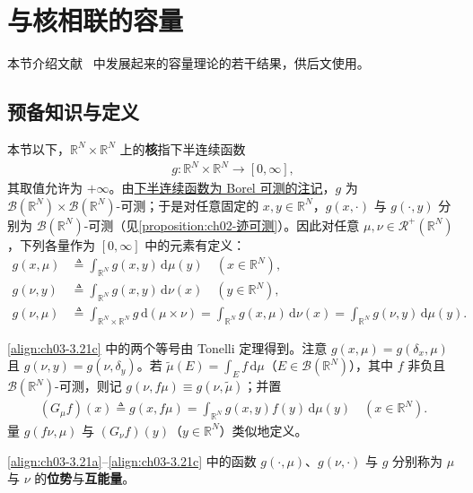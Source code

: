 \documentclass[../../main.tex]{subfiles}%
\begin{document}
\section{与核相联的容量}\label{section:ch03-核容量}

本节介绍文献~\cite{ref72} 中发展起来的容量理论的若干结果，供后文使用。

\subsection{预备知识与定义}\label{subsection:ch03-核预备}

本节以下，$\mathbb{R}^N\times\mathbb{R}^N$ 上的\textbf{核}指下半连续函数
\begin{align*}
g:\mathbb{R}^N\times\mathbb{R}^N\to[0,\infty],
\end{align*}
其取值允许为 $+\infty$。由\hyperref[remark:ch02-连续半连续Borel]{下半连续函数为 Borel 可测的注记}，$g$ 为 $\mathcal{B}(\mathbb{R}^N)\times\mathcal{B}(\mathbb{R}^N)$-可测；于是对任意固定的 $x,y\in\mathbb{R}^N$，$g(x,\cdot)$ 与 $g(\cdot,y)$ 分别为 $\mathcal{B}(\mathbb{R}^N)$-可测（见\cref{proposition:ch02-迹可测}）。因此对任意 $\mu,\nu\in\mathscr{R}^+(\mathbb{R}^N)$，下列各量作为 $[0,\infty]$ 中的元素有定义：
\begin{align}
g(x,\mu)&\triangleq\int_{\mathbb{R}^N}g(x,y)\,\mathrm{d}\mu(y)\quad(x\in\mathbb{R}^N),\label{align:ch03-3.21a}\\
g(\nu,y)&\triangleq\int_{\mathbb{R}^N}g(x,y)\,\mathrm{d}\nu(x)\quad(y\in\mathbb{R}^N),\label{align:ch03-3.21b}\\
g(\nu,\mu)&\triangleq\int_{\mathbb{R}^N\times\mathbb{R}^N}g\,\mathrm{d}(\mu\times\nu)
=\int_{\mathbb{R}^N}g(x,\mu)\,\mathrm{d}\nu(x)
=\int_{\mathbb{R}^N}g(\nu,y)\,\mathrm{d}\mu(y).\label{align:ch03-3.21c}
\end{align}

\eqref{align:ch03-3.21c} 中的两个等号由 Tonelli 定理得到。注意 $g(x,\mu)=g(\delta_x,\mu)$ 且 $g(\nu,y)=g(\nu,\delta_y)$。若 $\tilde\mu(E)=\int_Ef\,\mathrm{d}\mu$（$E\in\mathcal{B}(\mathbb{R}^N)$），其中 $f$ 非负且 $\mathcal{B}(\mathbb{R}^N)$-可测，则记 $g(\nu,f\mu)\equiv g(\nu,\tilde\mu)$；并置
\begin{align}
(G_\mu f)(x)\triangleq g(x,f\mu)=\int_{\mathbb{R}^N}g(x,y)f(y)\,\mathrm{d}\mu(y)\quad(x\in\mathbb{R}^N).\label{align:ch03-3.22}
\end{align}
量 $g(f\nu,\mu)$ 与 $(G_\nu f)(y)$（$y\in\mathbb{R}^N$）类似地定义。

\eqref{align:ch03-3.21a}--\eqref{align:ch03-3.21c} 中的函数 $g(\cdot,\mu)$、$g(\nu,\cdot)$ 与 $g$ 分别称为 $\mu$ 与 $\nu$ 的\textbf{位势}与\textbf{互能量}。
\end{document}
